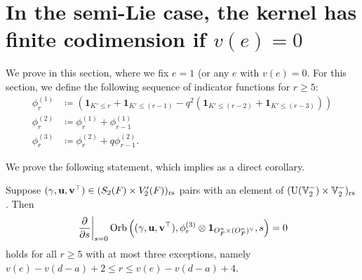 \section{In the semi-Lie case, the kernel has finite codimension if $v(e)=0$}
We prove  in this section,
where we fix $e = 1$ (or any $e$ with $v(e) = 0$.
For this section,
we define the following sequence of indicator functions for $r \ge 5$:
\begin{align*}
  \phi^{(1)}_r &\coloneqq
  \left( \mathbf{1}_{K' \le r} + \mathbf{1}_{K' \le (r-1)}
     - q^2 (\mathbf{1}_{K' \le (r-2)} + \mathbf{1}_{K' \le (r-3)}) \right) \\
  \phi^{(2)}_r &\coloneqq \phi^{(1)}_r + \phi^{(1)}_{r-1} \\
  \phi^{(3)}_r &\coloneqq \phi^{(2)}_r + q \phi^{(2)}_{r-1}.
\end{align*}

We prove the following statement,
which implies  as a direct corollary.
\begin{theorem}
  Suppose ${(\gamma, \mathbf u, \mathbf v^\top)} \in (S_2(F) \times V_2'(F))_{\mathrm{rs}}$
  pairs with an element of $(\operatorname{U}(\mathbb V_2^-) \times \mathbb V_2^-)_{\mathrm{rs}}$.
  Then
  \[
    \left. \pdv{}{s} \right\rvert_{s=0}
    \operatorname{Orb} \left( {(\gamma, \mathbf u, \mathbf v^\top)}, \phi^{(3)}_r \otimes \mathbf{1}_{O_F^n \times (O_F^n)^\vee}, s \right) = 0
  \]
  holds for all $r \ge 5$ with at most three exceptions,
  namely $v(e) - v(d-a) + 2 \le r \le v(e) - v(d-a) + 4$.
\end{theorem}
